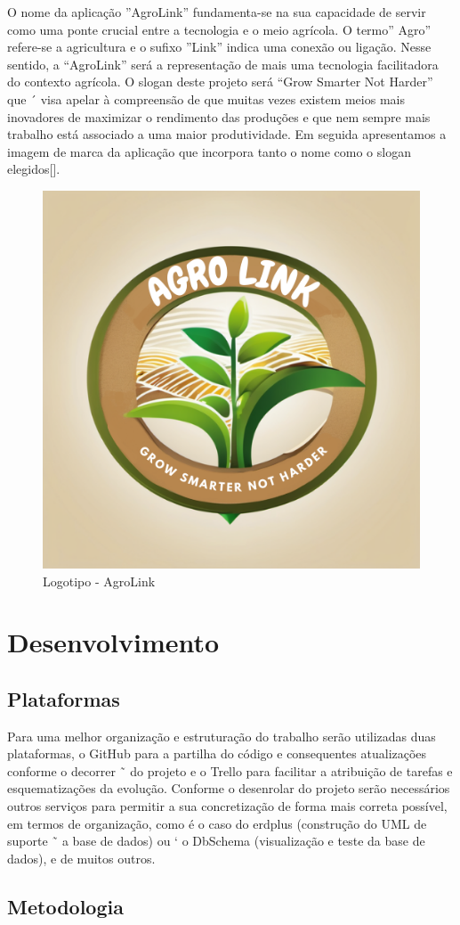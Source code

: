 \documentclass[conference]{IEEEtran}
\begin{document}
	O nome da aplicação ”AgroLink” fundamenta-se na sua capacidade de servir como uma ponte
	crucial entre a tecnologia e o meio agrícola. O termo” Agro” refere-se a agricultura e o sufixo
	”Link” indica uma conexão ou ligação. Nesse sentido, a “AgroLink” será a representação de
	mais uma tecnologia facilitadora do contexto agrícola. O slogan deste projeto será “Grow
	Smarter Not Harder” que ´ visa apelar à compreensão de que muitas vezes existem meios mais
	inovadores de maximizar o rendimento das produções e que nem sempre mais trabalho está
	associado a uma maior produtividade. Em seguida apresentamos a imagem de marca da
	aplicação que incorpora tanto o nome como o slogan elegidos[].
	
\begin{figure}[h]
	\centering
	\includegraphics[width=0.4\linewidth]{AGROLINK.png}
	\caption{Logotipo - AgroLink}
	\label{fig:agrolink}
\end{figure}

	
	\section{Desenvolvimento}
	\subsection{Plataformas}\label{AA}
	Para uma melhor organização e estruturação do trabalho serão utilizadas duas plataformas, o
	GitHub para a partilha do código e consequentes atualizações conforme o decorrer ˜ do
	projeto e o Trello para facilitar a atribuição de tarefas e esquematizações da evolução.
	Conforme o desenrolar do projeto serão necessários outros serviços para permitir a sua
	concretização de forma mais correta possível, em termos de organização, como é o caso do
	erdplus (construção do UML de suporte ˜ a base de dados) ou ` o DbSchema (visualização e
	teste da base de dados), e de muitos outros.
	
	
	\subsection{Metodologia}
	
\end{document}
